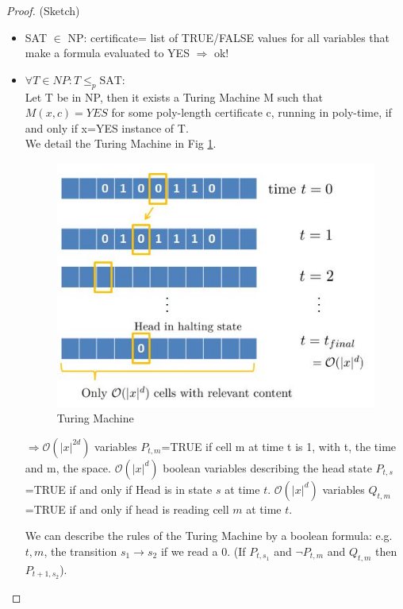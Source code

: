 \begin{proof}
(Sketch) 
\begin{itemize}
\item SAT $\in$ NP: certificate= list of TRUE/FALSE values for all variables that make a formula evaluated to YES $\Rightarrow$ ok!
\item  $\forall T \in NP: T \leq_p \text{SAT}$: \\ Let T be in NP, then it exists a Turing Machine M such that $M(x,c)=YES$ for some poly-length certificate c, running in poly-time, if and only if x=YES instance of T.\\
 
We detail the Turing Machine in Fig \ref{c12:turing machine}. 

\begin{figure}[h!]
\centering
\includegraphics[scale=0.7]{images/fig_2.jpg}
\caption{Turing Machine}
\label{c12:turing machine}
\end{figure}

 $\Rightarrow \mathcal{O}\left( \vert x \vert^{2d} \right)$ variables $P_{t,m}$=TRUE if cell m at time t is 1, with t, the time and m, the space. $\mathcal{O}\left( \vert x \vert^{d} \right)$ boolean variables describing the head state $P_{t,s}$=TRUE if and only if Head is in state $s$ at time $t$. $\mathcal{O}\left( \vert x \vert^{d} \right)$ variables $Q_{t,m}$=TRUE if and only if head is reading cell $m$ at time $t$. 
 
 We can describe the rules of the Turing Machine by a boolean formula: e.g. $t,m$, the transition $s_1 \longrightarrow s_2$ if we read a $0$. (If $P_{t,s_1}$ and $\neg P_{t,m}$ and $Q_{t,m}$ then $P_{t+1,s_2}$).
 

\end{itemize}
\end{proof}
